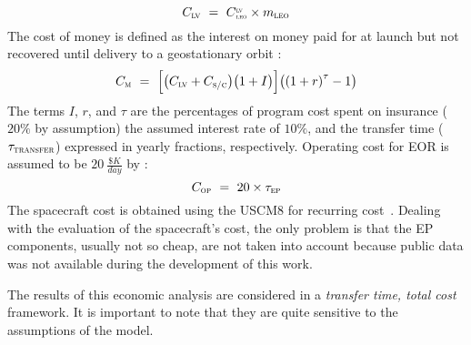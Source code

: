 \begin{equation}
C_{\scriptstyle{\textsc{lv}}}~=~ C{\scriptstyle{_{\textsc{leo}}^\textsc{lv}}}\times m_{\scriptstyle{\textsc{leo}}}
\end{equation}
The cost of money is defined as the interest on money paid for at launch but not recovered until delivery to a geostationary orbit \cite{Randolph:2002aa}:
\begin{equation}
C_{\scriptstyle{\textsc{m}}}~=~%
\Bigl[\bigl(C_{\scriptstyle{\textsc{lv}}}%
+C_{\scriptstyle{\textsc{s/c}}}\bigr)%
\bigl(1+I\bigr)\Bigr]\bigl(\left(1+r\right)^{\tau}-1\bigr)
\end{equation}
The terms $I$, $r$, and $\tau$ are the percentages of program cost spent on insurance ($20\%$ by assumption) the assumed interest rate of $10\%$, and the transfer time ($\tau_{\textsc{transfer}}$) expressed in yearly fractions, respectively.
Operating cost for EOR is assumed to be $20~\tfrac{\$K}{day}$ by \cite{Randolph:2002aa}:
\begin{equation}
C_{\scriptstyle{\textsc{op}}}~=~20\times\tau_{\textsc{ep}}
\end{equation}
The spacecraft cost is obtained using the \textsc{USCM8} for recurring cost~\cite{wertz2011space}.
Dealing with the evaluation of the spacecraft's cost, the only problem is that the EP components, usually not so cheap, are not taken into account because public data was not available during the development of this work.

The results of this economic analysis are considered in a \emph{transfer time, total cost} framework. 
It is important to note that they are quite sensitive to the assumptions of the model.